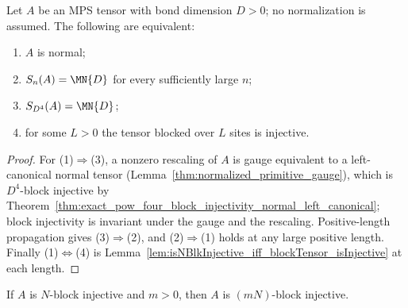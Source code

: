 \begin{theorem}
    \label{thm:normality_equivalent_forms}
    \leanok
    Let $A$ be an MPS tensor with bond dimension $D>0$; no normalization is
    assumed. The following are equivalent:
    \begin{enumerate}
        \item $A$ is normal;
        \item $S_n(A)=\MN{D}$ for every sufficiently large $n$;
        \item $S_{D^4}(A)=\MN{D}$;
        \item for some $L>0$ the tensor blocked over $L$ sites is injective.
    \end{enumerate}
\end{theorem}

\begin{proof}
    \leanok
    For (1)$\Rightarrow$(3), a nonzero rescaling of $A$ is gauge equivalent to a
    left-canonical normal tensor (Lemma~\ref{thm:normalized_primitive_gauge}),
    which is $D^4$-block injective by
    Theorem~\ref{thm:exact_pow_four_block_injectivity_normal_left_canonical};
    block injectivity is invariant under the gauge and the rescaling.
    Positive-length propagation gives (3)$\Rightarrow$(2), and (2)$\Rightarrow$(1)
    holds at any large positive length. Finally (1)$\Leftrightarrow$(4) is
    Lemma~\ref{lem:isNBlkInjective_iff_blockTensor_isInjective} at each length.
\end{proof}

\begin{lemma}
    \label{thm:exact_block_injectivity_positive_multiple}
    \leanok
    If $A$ is $N$-block injective and $m>0$, then $A$ is
    $(mN)$-block injective.
\end{lemma}

